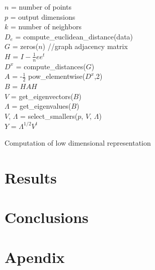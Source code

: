 \documentclass[12pt,journal]{IEEEtran}
\begin{document}
\begin{algorithm}
    $n$ = number of points\\
    $p$ = output dimensions\\
    $k$ = number of neighbors\\
    \vspace{0.5cm}
    $D_e$ = compute\_euclidean\_distance(data)\\
    $G$ = zeros($n$) //graph adjacency matrix\\
    \vspace{0.5cm}
    \vspace{0.5cm}
    $H$ = $I - \frac{1}{n} e e^t$\\
    $D^x$ = compute\_distances($G$)\\
    $A$ = -$\frac{1}{2}$ pow\_elementwise($D^x$,2)\\
    $B$ = $HAH$\\
    $V$ = get\_eigenvectors($B$)\\
    $\Lambda$ = get\_eigenvalues($B$)\\
    $V$, $\Lambda$ = select\_smallers($p$, $V$, $\Lambda$)\\
    $Y$ = $\Lambda^{1/2} V^t$

    \vspace{0.5cm}

    \caption{Computation of low dimensional representation}
    \label{alg1}
\end{algorithm}

\cite{matlab}

\section{Results}

\section{Conclusions}


    \section{Apendix}
\end{document}
